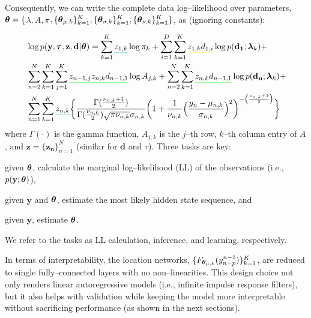 \documentclass[runningheads]{llncs}
\def\mathunderline#1#2{\color{#1}\underline{{\color{black}#2}}\color{black}}
\begin{document}
Consequently, we can write the complete data log--likelihood over parameters, $\text{\boldmath$\theta$\unboldmath}=\{$\boldmath$\lambda$\unboldmath$, A,$\boldmath$\pi$\unboldmath$,\{\text{\boldmath$\theta$\unboldmath}_{\mu, k}\}_{k=1}^K,\{\text{\boldmath$\theta$\unboldmath}_{\sigma, k}\}_{k=1}^K,\{\text{\boldmath$\theta$\unboldmath}_{\nu, k}\}_{k=1}^K \}$, as (ignoring constants):

\begin{equation}
\begin{split}
&\log{p(\mathbf{y}, \text{\boldmath$\tau$\unboldmath}, \mathbf{z}, \mathbf{d}| \text{\boldmath$\theta$\unboldmath})} =
\sum_{k=1}^{K} \mathunderline{cyan}{z_{1,k}} \log\pi_k+ \sum_{i=1}^{D}\sum_{k=1}^{K} \mathunderline{yellow}{z_{1,k} d_{1,i}} \log p(\mathbf{d_1};\text{\boldmath$\lambda$\unboldmath}_k) +\\
&\sum_{n=2}^{N}\sum_{k=1}^{K}\sum_{j=1}^{K}  \mathunderline{green}{z_{n-1,j} z_{n,k} d_{n-1,1}} \log A_{j,k} + \sum_{n=2}^{N}\sum_{k=1}^{K} \mathunderline{green}{z_{n,k} d_{n-1,1}} \log p(\mathbf{d_n};\text{\boldmath$\lambda$\unboldmath}_k) +\\ 
&\sum_{n=1}^{N}\sum_{k=1}^{K} \mathunderline{cyan}{z_{n,k}}\bigg\{ 
\frac{\Gamma(\frac{\nu_{n,k} + 1}{2})}{\Gamma(\frac{\nu_{n,k}}{2})\sqrt{\pi\nu_{n,k}}\sigma_{n,k}}
\bigg(1 + \frac{1}{\nu_{n,k}}
\Big(\frac{y_n - \mu_{n,k}}
{\sigma_{n,k}}\Big)^2\bigg)^
{-\big(\frac{\nu_{n,k}+1}{2}\big)} \bigg\}
\end{split}
\label{eq:loglike}
\end{equation}
where $\Gamma(\cdot)$ is the gamma function, $A_{j,k}$ is the $j$--th row, $k$--th column entry of $A$, and $\mathbf{z}=\{\mathbf{z_n}\}_{n=1}^N$ (similar for $\mathbf{d}$ and \boldmath$\tau$\unboldmath). Three tasks are key: \begin{enumerate*}[label=\alph*)] 
	\item given $\text{\boldmath$\theta$\unboldmath}$, calculate the marginal log--likelihood (LL) of the observations (i.e., $p(\mathbf{y};\text{\boldmath$\theta$\unboldmath})$), \item given $\mathbf{y}$ and $\text{\boldmath$\theta$\unboldmath}$, estimate the most likely hidden state sequence, and 
	\item given $\mathbf{y}$, estimate $\text{\boldmath$\theta$\unboldmath}$.
	\end{enumerate*} We refer to the tasks as LL calculation, inference, and learning, respectively. 

In terms of interpretability, the location networks, $\{F_{\text{\boldmath$\theta$\unboldmath}_{\mu, k}}(y_{n-p}^{n-1})\}_{k=1}^K$, are reduced to single fully--connected layers with no non--linearities. This design choice not only renders linear autoregressive models (i.e., infinite impulse response filters), but it also helps with validation while keeping the model more interpretable without sacrificing performance (as shown in the next sections).
\end{document}
